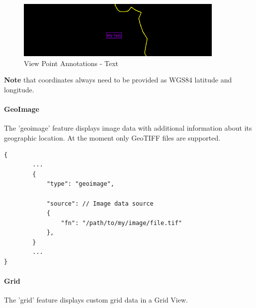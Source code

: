 \begin{figure}[H]
    \center
        \includegraphics[width=10cm]{figures/viewpoints_anno_example_text.png}
    \caption{View Point Annotations - Text} 
\end{figure}

\textbf{Note} that coordinates always need to be provided as WGS84 latitude and longitude. \\

\paragraph{GeoImage} The 'geoimage' feature displays image data with additional information about its geographic location.
At the moment only GeoTIFF files are supported.

\begin{lstlisting}[basicstyle=\small\ttfamily]
{
        ...
        {
            "type": "geoimage",

            "source": // Image data source
            {
                "fn": "/path/to/my/image/file.tif"
            },
        }
        ...
}
\end{lstlisting}



\paragraph{Grid} The 'grid' feature displays custom grid data in a Grid View.

